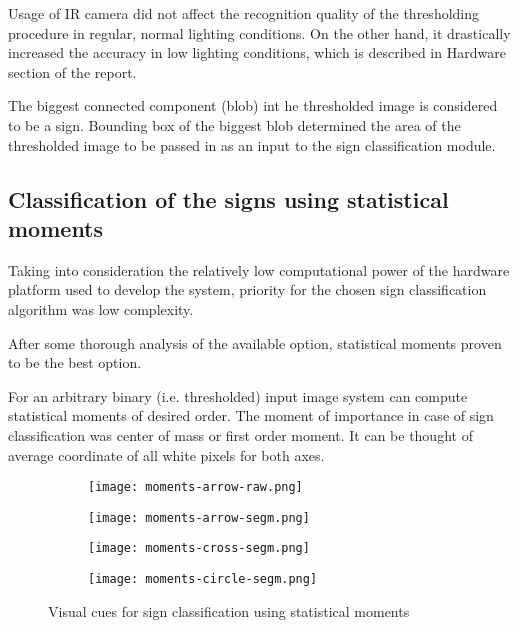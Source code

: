 Usage of IR camera did not affect the recognition quality of the thresholding procedure in regular, normal lighting conditions. On the other hand, it drastically increased the accuracy in low lighting conditions, which is described in Hardware section of the report.

The biggest connected component (blob) int he thresholded image is considered to be a sign. Bounding box of the biggest blob determined the area of the thresholded image to be passed in as an input to the sign classification module. 

\subsection{Classification of the signs using statistical moments}

Taking into consideration the relatively low computational power of the hardware platform used to develop the system, priority for the chosen sign classification algorithm was low complexity.

After some thorough analysis of the available option, statistical moments proven to be the best option.

For an arbitrary binary (i.e. thresholded) input image system can compute statistical moments of desired order. The moment of importance in case of sign classification was center of mass or first order moment. It can be thought of average coordinate of all white pixels for both axes.

\begin{figure}[th!]
	\centering
	\begin{subfigure}[b]{0.25\textwidth}
		\centering
		\texttt{[image: moments-arrow-raw.png]}
	\end{subfigure}
	\begin{subfigure}[b]{0.25\textwidth}
		\centering
		\texttt{[image: moments-arrow-segm.png]}
	\end{subfigure}
	\begin{subfigure}[b]{0.2\textwidth}
		\centering
		\texttt{[image: moments-cross-segm.png]}
	\end{subfigure}
	\begin{subfigure}[b]{0.2\textwidth}
		\centering
		\texttt{[image: moments-circle-segm.png]}
	\end{subfigure}
	\caption{Visual cues for sign classification using statistical moments}
	\label{fig:statistical-moments}
\end{figure}

